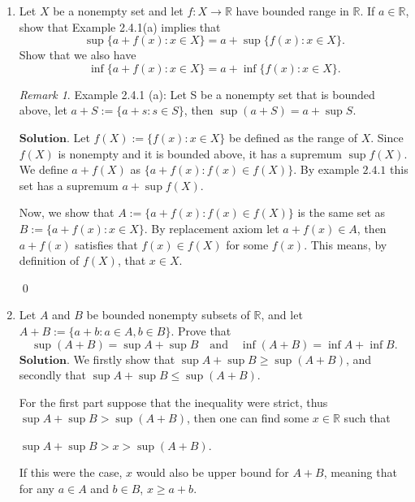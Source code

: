\documentclass{article}
\theoremstyle{remark}
\newtheorem*{remark}{Remark}
\begin{document}
\begin{enumerate}
            \item Let \( X \) be a nonempty set and let \( f : X \to \mathbb{R} \) have bounded range in \( \mathbb{R} \). 
            If \( a \in \mathbb{R} \), show that Example 2.4.1(a) implies that
            \[
            \sup\{a + f(x) : x \in X\} = a + \sup\{f(x) : x \in X\}.
            \]
            Show that we also have
            \[
            \inf\{a + f(x) : x \in X\} = a + \inf\{f(x) : x \in X\}.
            \]
            \begin{remark}
                Example 2.4.1 (a): Let S be a nonempty set that is bounded above, let $a+S := \{a+s : s\in S\}$, then 
                $\sup(a+S) = a + \sup S$.
            \end{remark}
            $\textbf{Solution.}$ 
            Let $f(X) := \{f(x): x\in X\}$ be defined as the range of $X$. Since $f(X)$ is nonempty and it is bounded above, it has a supremum $\sup f(X)$.
            We define $a + f(X)$ as $\{a + f(x): f(x) \in f(X)\}$.
            By example $2.4.1$ this set has a supremum $a + \sup f(X)$.

            Now, we show that $A := \{a + f(x): f(x) \in f(X)\}$ is the same set as $B := \{a + f(x): x \in X\}$.
            By replacement axiom let $a + f(x) \in A$, then $a + f(x)$ satisfies that $f(x) \in f(X)$ for some $f(x)$.
            This means, by definition of $f(X)$, that $x \in X$.
            \begin{flushright}
                \qed
            \end{flushright}

            \item Let \( A \) and \( B \) be bounded nonempty subsets of \( \mathbb{R} \), and let \( A + B := \{a + b : a \in A, b \in B\} \). 
            Prove that
            \[
            \sup(A + B) = \sup A + \sup B \quad \text{and} \quad \inf(A + B) = \inf A + \inf B.
            \]            
            $\textbf{Solution.}$ We firstly show that $\sup A + \sup B \geq \sup(A+B)$,
            and secondly that $\sup A + \sup B \leq \sup(A+B)$.

            For the first part suppose that the inequality were strict, thus $\sup A + \sup B > \sup(A+B)$,
            then one can find some $x \in \mathbb{R}$ such that 
            \begin{center}
                $\displaystyle \sup A + \sup B > x > \sup(A+B)$.
            \end{center}
            If this were the case, $x$ would also be upper bound for $A+B$, meaning that for any $a \in A$ and $b \in B$,
            $x \geq a+b$.
            

\end{enumerate}
\end{document}
